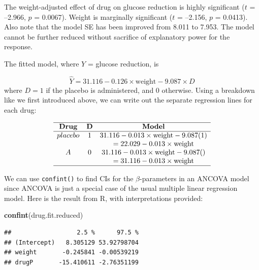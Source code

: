 \documentclass[
]{book}
\newenvironment{Shaded}{\begin{snugshade}}{\end{snugshade}}
\newcommand{\FunctionTok}[1]{\textcolor[rgb]{0.13,0.29,0.53}{\textbf{#1}}}
\newcommand{\NormalTok}[1]{#1}
\begin{document}
The weight-adjusted effect of drug on glucose reduction is highly significant (\(t\) = --2.966, \(p\) = 0.0067). Weight is marginally significant (\(t\) = --2.156, \(p\) = 0.0413). Also note that the model SE has been improved from 8.011 to 7.953. The model cannot be further reduced without sacrifice of explanatory power for the response.

The fitted model, where \(Y\) = glucose reduction, is

\[\hat{Y} = 31.116 - 0.126\times\textrm{weight} - 9.087\times D\]
where \(D = 1\) if the placebo is administered, and 0 otherwise. Using a breakdown like we first introduced above, we can write out the separate regression lines for each drug:

\[\begin{array}{ccc} 
\hline
\textbf{Drug} & \mathbf{D} & \textbf{Model} \\
\hline
placebo & 1 &  31.116 - 0.013\times\textrm{weight} - 9.087(1)  \\
& & = 22.029 - 0.013\times\textrm{weight} \\
A       & 0 &   31.116 - 0.013\times\textrm{weight} - 9.087() \\
& & = 31.116 - 0.013\times\textrm{weight} \\
\hline
\end{array}\]

We can use \texttt{confint()} to find CIs for the \(\beta\)-parameters in an ANCOVA model since ANCOVA is just a special case of the usual multiple linear regression model. Here is the result from R, with interpretations provided:

\begin{Shaded}
\begin{Highlighting}[]
\FunctionTok{confint}\NormalTok{(drug.fit.reduced)}
\end{Highlighting}
\end{Shaded}

\begin{verbatim}
##                  2.5 %      97.5 %
## (Intercept)   8.305129 53.92798704
## weight       -0.245841 -0.00539219
## drugP       -15.410611 -2.76351199
\end{verbatim}
\end{document}
